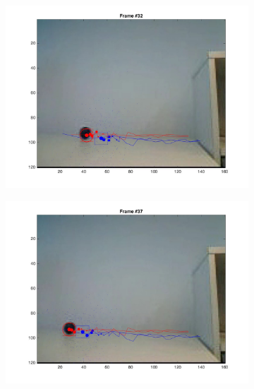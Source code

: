 \documentclass{ethz_report}
\begin{document}
\begin{figure}[h]
\begin{subfigure}[b]{.25\textwidth}
        \includegraphics[width=1\linewidth]{images/video3_model_31}
    \end{subfigure}%
    \begin{subfigure}[b]{.25\textwidth}
        \centering
        \includegraphics[width=1\linewidth]{images/video3_model_36}
    \end{subfigure}
    \begin{subfigure}[b]{.25\textwidth}
        \centering

\end{subfigure}
\end{figure}
\end{document}
